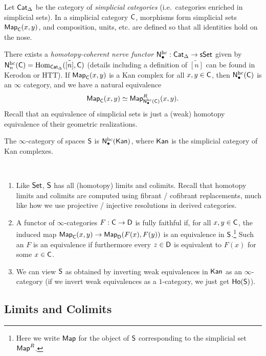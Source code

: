 \documentclass{amsart}
\begin{document}
Let $\mathsf{Cat}_\Delta$ be the category of \emph{simplicial categories} (i.e.\ categories enriched in simplicial sets).
In a simplicial category $\mathsf{C}$, morphisms form simplicial sets $\mathsf{Map}_{\mathsf{C}}(x, y)$, and composition, units, etc. are defined so that all identities hold on the nose.

There exists a \emph{homotopy-coherent nerve functor} $\mathsf{N}_\bullet^{\mathrm{hc}}: \mathsf{Cat}_\Delta \to \mathsf{sSet}$ given by $\mathsf{N}_n^{\mathrm{hc}}(\mathsf{C}) = \operatorname{Hom}_{\mathsf{Cat}_\Delta}(\tilde{[n]}, \mathsf{C})$ (details including a definition of $\tilde{[n]}$ can be found in Kerodon or HTT).
If $\mathsf{Map}_{\mathsf{C}}(x, y)$ is a Kan complex for all $x, y \in \mathsf{C}$, then $\mathsf{N}_\bullet^{\mathrm{hc}}(\mathsf{C})$ is an $\infty$ category, and we have a natural equivalence
\[
	\mathsf{Map}_{\mathsf{C}}(x, y) \simeq \mathsf{Map}_{\mathsf{N}_\bullet^{\mathrm{hc}}(\mathsf{C})}^R(x, y).
\]
Recall that an equivalence of simplicial sets is just a (weak) homotopy equivalence of their geometric realizations.

\begin{dfn}
	The $\infty$-category of spaces $\mathsf{S}$ is $\mathsf{N}_\bullet^{\mathrm{hc}}(\mathsf{Kan})$, where $\mathsf{Kan}$ is the simplicial category of Kan complexes.
\end{dfn}

\begin{rmk}
	\,
	\begin{enumerate}
		\item Like $\mathsf{Set}$, $\mathsf{S}$ has all (homotopy) limits and colimits.
			Recall that homotopy limits and colimits are computed using fibrant / cofibrant replacements, much like how we use projective / injective resolutions in derived categories.
		\item A functor of $\infty$-categories $F: \mathsf{C} \to \mathsf{D}$ is fully faithful if, for all $x, y \in \mathsf{C}$, the induced map $\mathsf{Map}_{\mathsf{C}}(x, y) \to \mathsf{Map}_{\mathsf{D}}(F(x), F(y))$ is an equivalence in $\mathsf{S}$.\footnote{Here we write $\mathsf{Map}$ for the object of $\mathsf{S}$ corresponding to the simplicial set $\mathsf{Map}^R$.}
			Such an $F$ is an equivalence if furthermore every $z \in \mathsf{D}$ is equivalent to $F(x)$ for some $x \in \mathsf{C}$.
		\item We can view $\mathsf{S}$ as obtained by inverting weak equivalences in $\mathsf{Kan}$ as an $\infty$-category (if we invert weak equivalences as a $1$-category, we just get $\mathsf{Ho}(\mathsf{S})$).
	\end{enumerate}
\end{rmk}

\subsection{Limits and Colimits}
\end{document}
